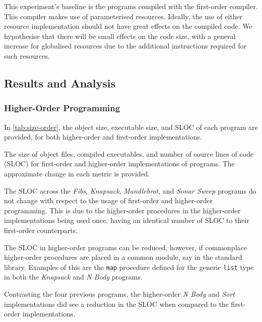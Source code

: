 This experiment's baseline is the programs compiled with the first-order compiler. This compiler makes use of parameterised resources. Ideally, the use of either resource implementation should not have great effects on the compiled code. We hypothesise that there will be small effects on the code size, with a general increase for globalised resources due to the additional instructions required for such resources.

\subsection{Results and Analysis}

\subsubsection{Higher-Order Programming}

In \cref{tab:size-order}, the object size, executable size, and SLOC of each program are provided, for both higher-order and first-order implementations.

\begin{table}[ht]
  \centering
  \caption[The size of object files, compiled executables, and number of source lines of code for first-order and higher-order implementations of programs.]{The size of object files, compiled executables, and number of source lines of code (SLOC) for first-order and higher-order implementations of programs. The approximate change in each metric is provided.}
  \label{tab:size-order}
\end{table}

The SLOC across the \textit{Fibs}, \textit{Knapsack}, \textit{Mandlebrot}, and \textit{Sonar Sweep} programs do not change with respect to the usage of first-order and higher-order programming. This is due to the higher-order procedures in the higher-order implementations being used once, having an identical number of SLOC to their first-order counterparts. 

The SLOC in higher-order programs can be reduced, however, if commonplace higher-order procedures are placed in a common module, say in the standard library. Examples of this are the \texttt{map} procedure defined for the generic \texttt{list} type in both the \textit{Knapsack} and \textit{N Body} programs.

Contrasting the four previous programs, the higher-order \textit{N Body} and \textit{Sort} implementations did see a reduction in the SLOC when compared to the first-order implementations. 

